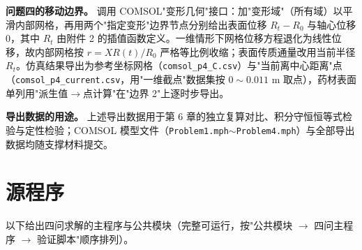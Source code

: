 \documentclass[12pt,a4paper]{article}
\begin{document}
\textbf{问题四的移动边界。} 调用 COMSOL"变形几何"接口：加"变形域"（所有域）以平滑内部网格，再用两个"指定变形"边界节点分别给出表面位移 $R_t-R_0$ 与轴心位移 $0$，其中 $R_t$ 由附件 2 的插值函数定义。一维情形下网格位移方程退化为线性位移，故内部网格按 $r=X R(t)/R_0$ 严格等比例收缩；表面传质通量改用当前半径 $R_t$。仿真结果导出为参考坐标网格（\texttt{comsol\_p4\_C.csv}）与"当前离中心距离"点（\texttt{comsol\_p4\_current.csv}，用"一维截点"数据集按 $0\sim0.011$ m 取点），药材表面单列用"派生值$\rightarrow$点计算"在"边界 2"上逐时步导出。

\textbf{导出数据的用途。} 上述导出数据用于第 6 章的独立复算对比、积分守恒恒等式检验与定性检验；COMSOL 模型文件（\texttt{Problem1.mph}$\sim$\texttt{Problem4.mph}）与全部导出数据均随支撑材料提交。

\section{源程序}

以下给出四问求解的主程序与公共模块（完整可运行，按"公共模块 $\rightarrow$ 四问主程序 $\rightarrow$ 验证脚本"顺序排列）。




















\end{document}
